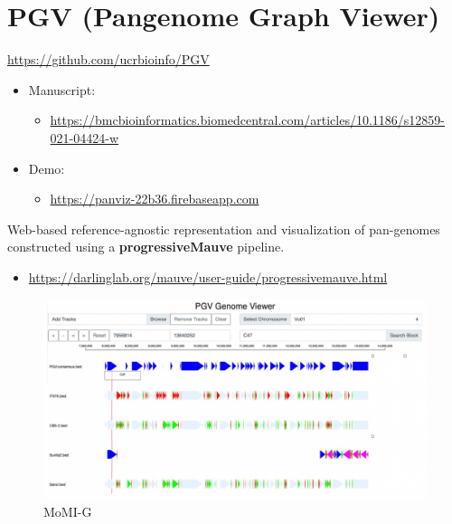 \documentclass[
]{book}
\providecommand{\tightlist}{%
  \setlength{\itemsep}{0pt}\setlength{\parskip}{0pt}}
\begin{document}
\hypertarget{pgv-pangenome-graph-viewer}{%
\section{PGV (Pangenome Graph Viewer)}\label{pgv-pangenome-graph-viewer}}

\url{https://github.com/ucrbioinfo/PGV}

\begin{itemize}
\tightlist
\item
  Manuscript:

  \begin{itemize}
  \tightlist
  \item
    \url{https://bmcbioinformatics.biomedcentral.com/articles/10.1186/s12859-021-04424-w}
  \end{itemize}
\item
  Demo:

  \begin{itemize}
  \tightlist
  \item
    \url{https://panviz-22b36.firebaseapp.com}
  \end{itemize}
\end{itemize}

Web-based reference-agnostic representation and visualization of pan-genomes constructed using a \textbf{progressiveMauve} pipeline.

\begin{itemize}
\tightlist
\item
  \url{https://darlinglab.org/mauve/user-guide/progressivemauve.html}
\end{itemize}

\begin{figure}
\centering
\includegraphics[width=1\textwidth,height=\textheight]{./Figures/PGV.png}
\caption{MoMI-G}
\end{figure}
\end{document}
